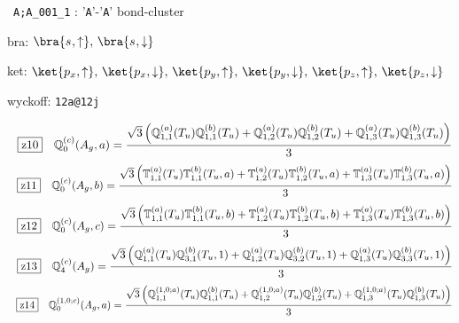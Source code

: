 \documentclass[fleqn,10pt,landscape]{jsarticle}
\begin{document}
\noindent\textbullet\, \texttt{A;A_001_1} : '\texttt{A}'-'\texttt{A}' bond-cluster

\noindent\quad * bra: $\bra{s_{},\uparrow},\, \bra{s_{},\downarrow}$

\noindent\quad * ket: $\ket{p_{x},\uparrow},\, \ket{p_{x},\downarrow},\, \ket{p_{y},\uparrow},\, \ket{p_{y},\downarrow},\, \ket{p_{z},\uparrow},\, \ket{p_{z},\downarrow}$

\noindent\quad * wyckoff: \texttt{12a@12j}

\begin{dmath*}
\hspace*{3mm}\fbox{z10}\quad \mathbb{Q}_{0}^{(c)}(A_{g},a)=\frac{\sqrt{3} \left(\mathbb{Q}_{1,1}^{(a)}(T_{u}) \mathbb{Q}_{1,1}^{(b)}(T_{u}) + \mathbb{Q}_{1,2}^{(a)}(T_{u}) \mathbb{Q}_{1,2}^{(b)}(T_{u}) + \mathbb{Q}_{1,3}^{(a)}(T_{u}) \mathbb{Q}_{1,3}^{(b)}(T_{u})\right)}{3}
\end{dmath*}
\begin{dmath*}
\hspace*{3mm}\fbox{z11}\quad \mathbb{Q}_{0}^{(c)}(A_{g},b)=\frac{\sqrt{3} \left(\mathbb{T}_{1,1}^{(a)}(T_{u}) \mathbb{T}_{1,1}^{(b)}(T_{u},a) + \mathbb{T}_{1,2}^{(a)}(T_{u}) \mathbb{T}_{1,2}^{(b)}(T_{u},a) + \mathbb{T}_{1,3}^{(a)}(T_{u}) \mathbb{T}_{1,3}^{(b)}(T_{u},a)\right)}{3}
\end{dmath*}
\begin{dmath*}
\hspace*{3mm}\fbox{z12}\quad \mathbb{Q}_{0}^{(c)}(A_{g},c)=\frac{\sqrt{3} \left(\mathbb{T}_{1,1}^{(a)}(T_{u}) \mathbb{T}_{1,1}^{(b)}(T_{u},b) + \mathbb{T}_{1,2}^{(a)}(T_{u}) \mathbb{T}_{1,2}^{(b)}(T_{u},b) + \mathbb{T}_{1,3}^{(a)}(T_{u}) \mathbb{T}_{1,3}^{(b)}(T_{u},b)\right)}{3}
\end{dmath*}
\begin{dmath*}
\hspace*{3mm}\fbox{z13}\quad \mathbb{Q}_{4}^{(c)}(A_{g})=\frac{\sqrt{3} \left(\mathbb{Q}_{1,1}^{(a)}(T_{u}) \mathbb{Q}_{3,1}^{(b)}(T_{u},1) + \mathbb{Q}_{1,2}^{(a)}(T_{u}) \mathbb{Q}_{3,2}^{(b)}(T_{u},1) + \mathbb{Q}_{1,3}^{(a)}(T_{u}) \mathbb{Q}_{3,3}^{(b)}(T_{u},1)\right)}{3}
\end{dmath*}
\begin{dmath*}
\hspace*{3mm}\fbox{z14}\quad \mathbb{Q}_{0}^{(1,0;c)}(A_{g},a)=\frac{\sqrt{3} \left(\mathbb{Q}_{1,1}^{(1,0;a)}(T_{u}) \mathbb{Q}_{1,1}^{(b)}(T_{u}) + \mathbb{Q}_{1,2}^{(1,0;a)}(T_{u}) \mathbb{Q}_{1,2}^{(b)}(T_{u}) + \mathbb{Q}_{1,3}^{(1,0;a)}(T_{u}) \mathbb{Q}_{1,3}^{(b)}(T_{u})\right)}{3}
\end{dmath*}
\end{document}
